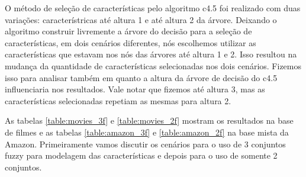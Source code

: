 \documentclass[template.tex]{subfiles}
\begin{document}
O método de seleção de características pelo algoritmo c4.5 foi realizado com duas variações: característricas até altura 1 e até altura 2 da árvore. Deixando o algoritmo construir livremente a árvore do decisão para a seleção de características, em dois cenários diferentes, nós escolhemos utilizar as características que estavam nos nós das árvores até altura 1 e 2. Isso resultou na mudança da quantidade de características selecionadas nos dois cenários. Fizemos isso para analisar também em quanto a altura da árvore de decisão do c4.5 influenciaria nos resultados. Vale notar que fizemos até altura 3, mas as características selecionadas repetiam as mesmas para altura 2. 

As tabelas \ref{table:movies_3f} e \ref{table:movies_2f} mostram os resultados na base de filmes e as tabelas \ref{table:amazon_3f} e \ref{table:amazon_2f} na base mista da Amazon. Primeiramente vamos discutir os cenários para o uso de 3 conjuntos fuzzy para modelagem das características e depois para o uso de somente 2 conjuntos.
\end{document}
